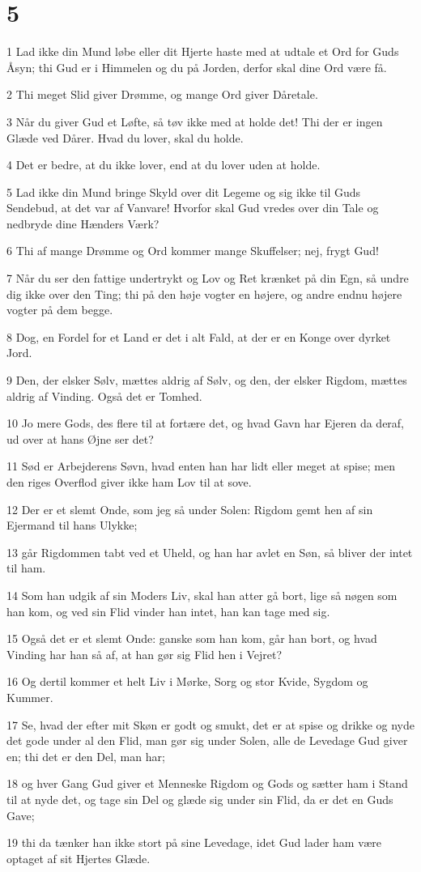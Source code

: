 \chapter{5}

\par 1 Lad ikke din Mund løbe eller dit Hjerte haste med at udtale et Ord for Guds Åsyn; thi Gud er i Himmelen og du på Jorden, derfor skal dine Ord være få.
\par 2 Thi meget Slid giver Drømme, og mange Ord giver Dåretale.
\par 3 Når du giver Gud et Løfte, så tøv ikke med at holde det! Thi der er ingen Glæde ved Dårer. Hvad du lover, skal du holde.
\par 4 Det er bedre, at du ikke lover, end at du lover uden at holde.
\par 5 Lad ikke din Mund bringe Skyld over dit Legeme og sig ikke til Guds Sendebud, at det var af Vanvare! Hvorfor skal Gud vredes over din Tale og nedbryde dine Hænders Værk?
\par 6 Thi af mange Drømme og Ord kommer mange Skuffelser; nej, frygt Gud!
\par 7 Når du ser den fattige undertrykt og Lov og Ret krænket på din Egn, så undre dig ikke over den Ting; thi på den høje vogter en højere, og andre endnu højere vogter på dem begge.
\par 8 Dog, en Fordel for et Land er det i alt Fald, at der er en Konge over dyrket Jord.
\par 9 Den, der elsker Sølv, mættes aldrig af Sølv, og den, der elsker Rigdom, mættes aldrig af Vinding. Også det er Tomhed.
\par 10 Jo mere Gods, des flere til at fortære det, og hvad Gavn har Ejeren da deraf, ud over at hans Øjne ser det?
\par 11 Sød er Arbejderens Søvn, hvad enten han har lidt eller meget at spise; men den riges Overflod giver ikke ham Lov til at sove.
\par 12 Der er et slemt Onde, som jeg så under Solen: Rigdom gemt hen af sin Ejermand til hans Ulykke;
\par 13 går Rigdommen tabt ved et Uheld, og han har avlet en Søn, så bliver der intet til ham.
\par 14 Som han udgik af sin Moders Liv, skal han atter gå bort, lige så nøgen som han kom, og ved sin Flid vinder han intet, han kan tage med sig.
\par 15 Også det er et slemt Onde: ganske som han kom, går han bort, og hvad Vinding har han så af, at han gør sig Flid hen i Vejret?
\par 16 Og dertil kommer et helt Liv i Mørke, Sorg og stor Kvide, Sygdom og Kummer.
\par 17 Se, hvad der efter mit Skøn er godt og smukt, det er at spise og drikke og nyde det gode under al den Flid, man gør sig under Solen, alle de Levedage Gud giver en; thi det er den Del, man har;
\par 18 og hver Gang Gud giver et Menneske Rigdom og Gods og sætter ham i Stand til at nyde det, og tage sin Del og glæde sig under sin Flid, da er det en Guds Gave;
\par 19 thi da tænker han ikke stort på sine Levedage, idet Gud lader ham være optaget af sit Hjertes Glæde.

